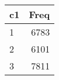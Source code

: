 
\begin{tabular}[t]{lr}
\toprule
c1 & Freq\\
\midrule
1 & 6783\\
2 & 6101\\
3 & 7811\\
\bottomrule
\end{tabular}